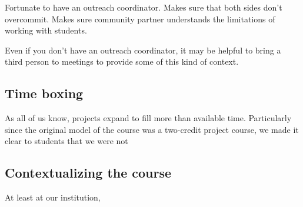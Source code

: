 Fortunate to have an outreach coordinator.  Makes sure that both sides
don't overcommit.  Makes sure community partner understands the limitations
of working with students.

Even if you don't have an outreach coordinator, it may be helpful to
bring a third person to meetings to provide some of this kind of context.

\subsection{Time boxing}

As all of us know, projects expand to fill more than available time.
Particularly since the original model of the course was a two-credit
project course, we made it clear to students that we were not 

\subsection{Contextualizing the course}

At least at our institution, 

